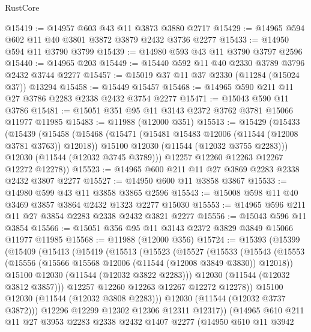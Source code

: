 \begin{lexlean}{RustCore}
\begin{coremodule}
@15419 := @14957 @603 @43 @11 @3873 @3880 @2717
@15429 := @14965 @594 @602 @11 @40 @3801 @3872 @3879 @2432 @3736 @2277
@15433 := @14950 @594 @11 @3790 @3799
@15439 := @14980 @593 @43 @11 @3790 @3797 @2596
@15440 := @14965 @203
@15449 := @15440 @592 @11 @40 @2330 @3789 @3796 @2432 @3744 @2277
@15457 := @15019 @37 @11 @37 @2330 (@11284 (@15024 @37)) @13294
@15458 := @15449 @15457
@15468 := @14965 @590 @211 @11 @27 @3786 @2283 @2338 @2432 @3754 @2277
@15471 := @15043 @590 @11 @3786
@15481 := @15051 @351 @95 @11 @3143 @2372 @3762 @3781 @15066 @11977 @11985
@15483 := @11988 (@12000 @351)
@15513 := @15429
    (@15433
      (@15439
        (@15458
          (@15468
            (@15471 (@15481 @15483 @12006 (@11544 (@12008 @3781 @3763)) @12018))
            @15100
            @12030
            (@11544 (@12032 @3755 @2283)))
          @12030
          (@11544 (@12032 @3745 @3789)))
        @12257
        @12260
        @12263
        @12267
        @12272
        @12278))
@15523 := @14965 @600 @211 @11 @27 @3869 @2283 @2338 @2432 @3807 @2277
@15527 := @14950 @600 @11 @3858 @3867
@15533 := @14980 @599 @43 @11 @3858 @3865 @2596
@15543 := @15008 @598 @11 @40 @3469 @3857 @3864 @2432 @1323 @2277 @15030
@15553 := @14965 @596 @211 @11 @27 @3854 @2283 @2338 @2432 @3821 @2277
@15556 := @15043 @596 @11 @3854
@15566 := @15051 @356 @95 @11 @3143 @2372 @3829 @3849 @15066 @11977 @11985
@15568 := @11988 (@12000 @356)
@15724 := @15393
    (@15399
      (@15409
        (@15413
          (@15419
            (@15513
              (@15523
                (@15527
                  (@15533
                    (@15543
                      (@15553
                        (@15556 (@15566 @15568 @12006 (@11544 (@12008 @3849 @3830)) @12018))
                        @15100
                        @12030
                        (@11544 (@12032 @3822 @2283)))
                      @12030
                      (@11544 (@12032 @3812 @3857)))
                    @12257
                    @12260
                    @12263
                    @12267
                    @12272
                    @12278))
                @15100
                @12030
                (@11544 (@12032 @3808 @2283)))
              @12030
              (@11544 (@12032 @3737 @3872)))
            @12296
            @12299
            @12302
            @12306
            @12311
            @12317))
        (@14965
          @610
          @211
          @11
          @27
          @3953
          @2283
          @2338
          @2432
          @1407
          @2277
          (@14950
            @610
            @11
            @3942

\end{coremodule}
\end{lexlean}
